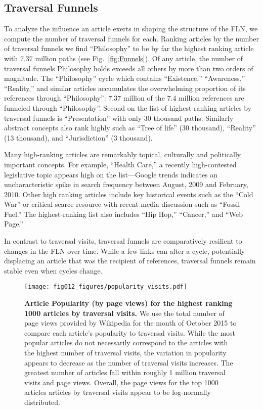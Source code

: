 \documentclass[pre,twocolumn,twoside,superscriptaddress,floatfix]{revtex4-1}
\begin{document}
{\subsection{Traversal Funnels}
\label{Traversal Funnels}

To analyze the influence an article exerts in shaping the 
structure of the FLN, we compute the number of traversal funnels for each.
Ranking articles by the number of traversal funnels we find 
``Philosophy'' to be by far the highest ranking article with 
$7.37$ million paths
(see Fig.~\ref{fig:Funnels}).
Of any article, the number of traversal funnels Philosophy holds exceeds 
all others by more than two orders of magnitude.
The ``Philosophy'' cycle which contains ``Existence,'' ``Awareness,'' ``Reality,'' 
and similar articles accumulates the overwhelming proportion of its 
references through ``Philosophy'': $7.37$ million of the $7.4$ million references
are funneled through ``Philosophy''.
Second on the list of highest-ranking articles by traversal funnels is 
``Presentation'' with only $30$ thousand paths. Similarly abstract 
concepts also rank highly such as ``Tree of life'' (30 thousand), 
``Reality'' (13 thousand), and ``Jurisdiction'' (3 thousand).

Many high-ranking articles are remarkably topical, culturally and politically important concepts.  For example, ``Health Care,'' a recently high-contested legislative topic appears high on the list---Google trends indicates an uncharacteristic spike in search frequency between August, 2009 and February, 2010.
Other high ranking articles include key historical events such as the ``Cold War'' or critical scarce resource with recent 
media discussion such as ``Fossil Fuel.'' 
The highest-ranking list also includes ``Hip Hop,'' ``Cancer,'' and ``Web Page.''

In contrast to traversal visits, traversal funnels are comparatively resilient to changes in the FLN over time. 
While a few links can alter a cycle, potentially displacing an article that was the recipient of references, traversal funnels remain stable even when cycles change.

\begin{figure}[tp!]
  \texttt{[image: fig012\_figures/popularity\_visits.pdf]}
  \caption{
\textbf{Article Popularity (by page views) for the highest ranking 1000 articles by traversal visits.}
We use the total number of page views provided by Wikipedia for the month
of October 2015 to compare each article's popularity to traversal visits.
While the most popular articles do not necessarily correspond to the articles
with the highest number of traversal visits, the variation in popularity appears to decrease as the number of traversal visits increases. The greatest number of articles fall within roughly 1 million traversal visits and page views. Overall, the page views for the top 1000 articles articles by traversal visits appear to be log-normally distributed. 
}
  \label{fig:Views and Visits}


\end{figure}}
\end{document}
